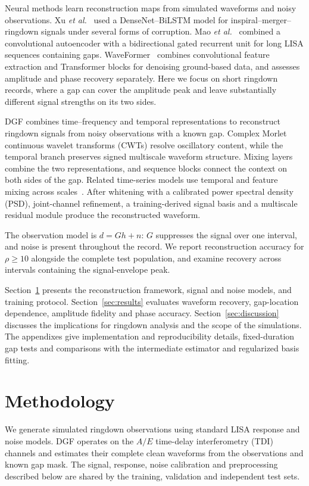 \documentclass[10pt,prd,aps,a4paper,twocolumn,superscriptaddress,nofootinbib,floatfix]{revtex4-2}
\begin{document}
Neural methods learn reconstruction maps from simulated waveforms and noisy observations. Xu \textit{et al.}~\cite{Xu_2024} used a DenseNet--BiLSTM model for inspiral--merger--ringdown signals under several forms of corruption. Mao \textit{et al.}~\cite{Mao:2025cae} combined a convolutional autoencoder with a bidirectional gated recurrent unit for long LISA sequences containing gaps. WaveFormer~\cite{Wang:2024waveformer} combines convolutional feature extraction and Transformer blocks for denoising ground-based data, and assesses amplitude and phase recovery separately. Here we focus on short ringdown records, where a gap can cover the amplitude peak and leave substantially different signal strengths on its two sides.

DGF combines time--frequency and temporal representations to reconstruct ringdown signals from noisy observations with a known gap. Complex Morlet continuous wavelet transforms (CWTs) resolve oscillatory content, while the temporal branch preserves signed multiscale waveform structure. Mixing layers combine the two representations, and sequence blocks connect the context on both sides of the gap. Related time-series models use temporal and feature mixing across scales~\cite{TSMixer2023,TimeMixer2024}. After whitening with a calibrated power spectral density (PSD), joint-channel refinement, a training-derived signal basis and a multiscale residual module produce the reconstructed waveform.

The observation model is $d=Gh+n$: $G$ suppresses the signal over one interval, and noise is present throughout the record. We report reconstruction accuracy for $\rho\ge10$ alongside the complete test population, and examine recovery across intervals containing the signal-envelope peak.

Section~\ref{sec:method} presents the reconstruction framework, signal and noise models, and training protocol. Section~\ref{sec:results} evaluates waveform recovery, gap-location dependence, amplitude fidelity and phase accuracy. Section~\ref{sec:discussion} discusses the implications for ringdown analysis and the scope of the simulations. The appendixes give implementation and reproducibility details, fixed-duration gap tests and comparisons with the intermediate estimator and regularized basis fitting.

\section{Methodology}\label{sec:method}
We generate simulated ringdown observations using standard LISA response and noise models. DGF operates on the $A/E$ time-delay interferometry (TDI) channels and estimates their complete clean waveforms from the observations and known gap mask. The signal, response, noise calibration and preprocessing described below are shared by the training, validation and independent test sets.
\end{document}
